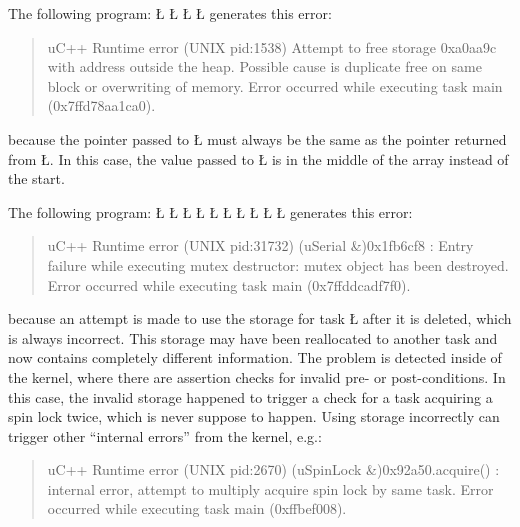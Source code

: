 \documentclass[openright,twoside]{report}
\begin{document}
The following program:
\LGinlinefalse\LGbegin\lgrinde
\L{}
\L{\LB{}}
\L{\LB{}}
\CE{}\L{\LB{\}}}
\endlgrinde\LGend
generates this error:
\begin{quote}
\BGfont
uC++ Runtime error (UNIX pid:1538) Attempt to free storage 0xa0aa9c with address outside the heap.
Possible cause is duplicate free on same block or overwriting of memory.
Error occurred while executing task main (0x7ffd78aa1ca0).
\end{quote}
because the pointer passed to \LGinlinetrue\LGbegin\lgrinde\L{}\endlgrinde\LGend{} must always be the same as the pointer returned from \LGinlinetrue\LGbegin\lgrinde\L{}\endlgrinde\LGend{}.
In this case, the value passed to \LGinlinetrue\LGbegin\lgrinde\L{}\endlgrinde\LGend{} is in the middle of the array instead of the start.

The following program:
\LGinlinefalse\LGbegin\lgrinde
\L{}
\L{\LB{}}
\L{}
\L{\LB{}}
\L{\LB{\};}}
\L{}
\L{\LB{}}
\L{\LB{}}
\L{\LB{}}
\CE{}\L{\LB{\}}}
\endlgrinde\LGend
generates this error:
\begin{quote}
\BGfont
uC++ Runtime error (UNIX pid:31732) (uSerial \&)0x1fb6cf8 : Entry failure while executing mutex destructor: mutex object has been destroyed.
Error occurred while executing task main (0x7ffddcadf7f0).
\end{quote}
because an attempt is made to use the storage for task \LGinlinetrue\LGbegin\lgrinde\L{}\endlgrinde\LGend{} after it is deleted, which is always incorrect.
This storage may have been reallocated to another task and now contains completely different information.
The problem is detected inside of the \uC kernel, where there are assertion checks for invalid pre- or post-conditions.
In this case, the invalid storage happened to trigger a check for a task acquiring a spin lock twice, which is never suppose to happen.
Using storage incorrectly can trigger other ``internal errors'' from the \uC kernel, e.g.:
\begin{quote}
\BGfont
uC++ Runtime error (UNIX pid:2670) (uSpinLock \&)0x92a50.acquire() : internal error, attempt to multiply acquire spin lock by same task.
Error occurred while executing task main (0xffbef008).
\end{quote}
\end{document}
